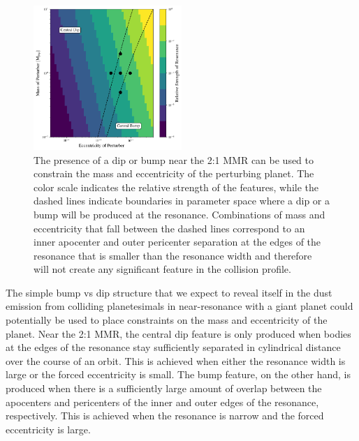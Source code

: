 \documentclass[twocolumn]{aastex63}
\begin{document}
\begin{figure}
\begin{center}
    \includegraphics[width=0.5\textwidth]{figures/bump_dip_diag.png}
    \caption{The presence of a dip or bump near the 2:1 MMR can be used to constrain the mass and eccentricity
    of the perturbing planet. The color scale indicates the relative strength of the features, while the dashed lines
    indicate boundaries in parameter space where a dip or a bump will be produced at the resonance. Combinations of mass and eccentricity that fall 
    between the dashed lines correspond to an inner apocenter and outer pericenter separation at the edges of the resonance that is smaller than the 
    resonance width and therefore will not create any significant feature in the collision profile.\label{fig:bump_dip_diag}}
\end{center}
\end{figure}

The simple bump vs dip structure that we expect to reveal itself in the dust emission from colliding planetesimals in near-resonance with a giant 
planet could potentially be used to place constraints on the mass and eccentricity of the planet. Near the 2:1 MMR, the central dip feature is only 
produced when bodies at the edges of the resonance stay sufficiently separated in cylindrical distance over the course of an orbit. This is achieved 
when either the resonance width is large or the forced eccentricity is small. The bump feature, on the other hand, is produced when there is a 
sufficiently large amount of overlap between the apocenters and pericenters of the inner and outer edges of the resonance, respectively. This is 
achieved when the resonance is narrow and the forced eccentricity is large.
\end{document}
